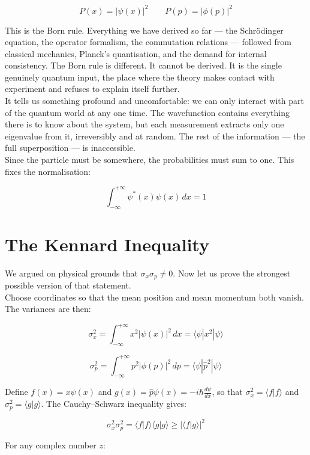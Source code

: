 \documentclass[krantz1,ChapterTOCs]{krantz}
\begin{document}
$$\boxed{P(x) = |\psi(x)|^2 \qquad P(p) = |\phi(p)|^2}$$

This is the Born rule. Everything we have derived so far --- the 
Schr\"{o}dinger equation, the operator formalism, the commutation 
relations --- followed from classical mechanics, Planck's 
quantisation, and the demand for internal consistency. The Born rule 
is different. It cannot be derived. It is the single genuinely 
quantum input, the place where the theory makes contact with 
experiment and refuses to explain itself further.\\

It tells us something profound and uncomfortable: we can only 
interact with part of the quantum world at any one time. The 
wavefunction contains everything there is to know about the system, 
but each measurement extracts only one eigenvalue from it, 
irreversibly and at random. The rest of the information --- the 
full superposition --- is inaccessible.\\

Since the particle must be somewhere, the probabilities must sum 
to one. This fixes the normalisation:

$$\boxed{\int_{-\infty}^{+\infty} \psi^*(x)\psi(x)\,dx = 1}$$

\section*{The Kennard Inequality}

We argued on physical grounds that $\sigma_x\sigma_p \neq 0$. Now 
let us prove the strongest possible version of that statement.\\

Choose coordinates so that the mean position and mean momentum both 
vanish. The variances are then:

$$\sigma_x^2 = \int_{-\infty}^{+\infty} x^2|\psi(x)|^2\,dx 
= \langle\psi|x^2|\psi\rangle$$

$$\sigma_p^2 = \int_{-\infty}^{+\infty} p^2|\phi(p)|^2\,dp 
= \langle\psi|\hat{p}^2|\psi\rangle$$

Define $f(x) = x\psi(x)$ and $g(x) = \hat{p}\psi(x) = 
-i\hbar\frac{d\psi}{dx}$, so that $\sigma_x^2 = \langle f|f\rangle$ 
and $\sigma_p^2 = \langle g|g\rangle$. The Cauchy--Schwarz inequality 
gives:

$$\sigma_x^2\sigma_p^2 = \langle f|f\rangle\langle g|g\rangle 
\geq |\langle f|g\rangle|^2$$

For any complex number $z$:
\end{document}
